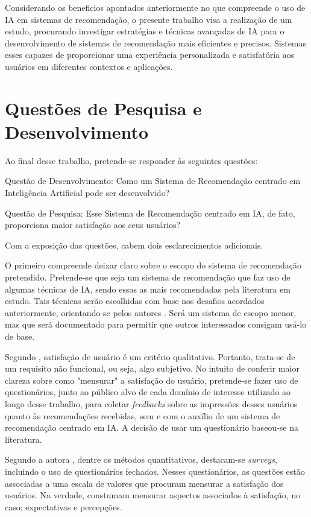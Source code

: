 Considerando os beneficios apontados anteriormente no que compreende o uso de IA em sistemas de recomendação, o presente trabalho 
visa a realização de um estudo, procurando investigar estratégias e técnicas avançadas de IA para o desenvolvimento
de sistemas de recomendação mais eficientes e precisos. Sistemas esses capazes de proporcionar uma experiência 
personalizada e satisfatória aos usuários em diferentes contextos e aplicações.

\section{Questões de Pesquisa e Desenvolvimento}\label{sec:questaopesquisa}
Ao final desse trabalho, pretende-se responder às seguintes questões:

Questão de Desenvolvimento: Como um Sistema de Recomendação centrado em Inteligência Artificial pode ser desenvolvido? 

Questão de Pesquisa: Esse Sistema de Recomendação centrado em IA, de fato, proporciona maior satisfação aos seus usuários?

Com a exposição das questões, cabem dois esclarecimentos adicionais.

O primeiro compreende deixar claro sobre o escopo do sistema de recomendação pretendido. Pretende-se que seja um sistema 
de recomendação que faz uso de algumas técnicas de IA, sendo essas as mais recomendadas pela literatura em estudo. 
Tais técnicas serão escolhidas com base nos desafios acordados anteriormente, orientando-se pelos autores 
. Será um sistema de escopo menor, mas que será documentado para permitir que outros interessados 
consigam usá-lo de base.

Segundo , satisfação de usuário é um critério qualitativo. Portanto, trata-se de um requisito não
funcional, ou seja, algo subjetivo. No intuito de conferir maior clareza sobre como "mensurar" a satisfação do usuário, pretende-se 
fazer uso de questionários, junto ao público alvo de cada domínio de interesse utilizado ao longo desse trabalho, 
para coletar \textit{feedbacks} sobre as impressões desses usuários quanto às recomendações recebidas, sem e com o auxílio de um 
sistema de recomendação centrado em IA. A decisão de usar um questionário baseou-se na literatura.

Segundo a autora , dentre os métodos quantitativos, destacam-se \textit{surveys}, incluindo o uso de questionários 
fechados. Nesses questionários, as questões estão associadas a uma escala de valores que procuram mensurar a satisfação 
dos usuários. Na verdade, constumam mensurar aspectos associados à satisfação, no caso: expectativas e percepções.

